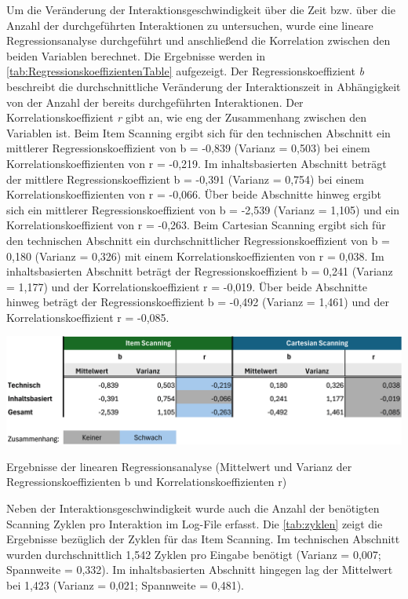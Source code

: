 Um die Veränderung der Interaktionsgeschwindigkeit über die Zeit bzw. über die Anzahl der durchgeführten Interaktionen zu untersuchen, wurde eine lineare Regressionsanalyse durchgeführt und anschließend die Korrelation zwischen den beiden Variablen berechnet. Die Ergebnisse werden in \autoref{tab:RegressionskoeffizientenTable} aufgezeigt. Der Regressionskoeffizient \textit{b} beschreibt die durchschnittliche Veränderung der Interaktionszeit in Abhängigkeit von der Anzahl der bereits durchgeführten Interaktionen. Der Korrelationskoeffizient \textit{r} gibt an, wie eng der Zusammenhang zwischen den Variablen ist. 
Beim Item Scanning ergibt sich für den technischen Abschnitt ein mittlerer Regressionskoeffizient von b = -0,839 (Varianz = 0,503) bei einem Korrelationskoeffizienten von r = -0,219. Im inhaltsbasierten Abschnitt beträgt der mittlere Regressionskoeffizient b = -0,391 (Varianz = 0,754) bei einem Korrelationskoeffizienten von r = -0,066. Über beide Abschnitte hinweg ergibt sich ein mittlerer Regressionskoeffizient von b = -2,539 (Varianz = 1,105) und ein Korrelationskoeffizient von r = -0,263.
Beim Cartesian Scanning ergibt sich für den technischen Abschnitt ein durchschnittlicher Regressionskoeffizient von b = 0,180 (Varianz = 0,326) mit einem Korrelationskoeffizienten von r = 0,038. Im inhaltsbasierten Abschnitt beträgt der Regressionskoeffizient b = 0,241 (Varianz = 1,177) und der Korrelationskoeffizient r = -0,019. Über beide Abschnitte hinweg beträgt der Regressionskoeffizient b = -0,492 (Varianz = 1,461) und der Korrelationskoeffizient r = -0,085.

\begin{table}[tbh]
    \centering
    \includegraphics[width=1.0\textwidth]{images/Results/Regressionskoeffizienten-Table.png}
    \caption{Ergebnisse der linearen Regressionsanalyse (Mittelwert und Varianz der Regressionskoeffizienten b und Korrelationskoeffizienten r)}
    \label{tab:RegressionskoeffizientenTable}
\end{table}

Neben der Interaktionsgeschwindigkeit wurde auch die Anzahl der benötigten Scanning Zyklen pro Interaktion im Log-File erfasst. Die \autoref{tab:zyklen} zeigt die Ergebnisse bezüglich der Zyklen für das Item Scanning. Im technischen Abschnitt wurden durchschnittlich 1,542 Zyklen pro Eingabe benötigt (Varianz = 0,007; Spannweite = 0,332). Im inhaltsbasierten Abschnitt hingegen lag der Mittelwert bei 1,423 (Varianz = 0,021; Spannweite = 0,481).

